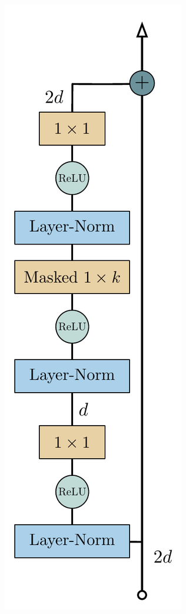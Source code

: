 \documentclass{article}
\begin{document}
\begin{figure}[t]
    \centering
    \begin{subfigure}{}
        \includegraphics[scale=.28]{blocks/mt_decoder_block}
    \end{subfigure}%

\end{figure}
\end{document}
